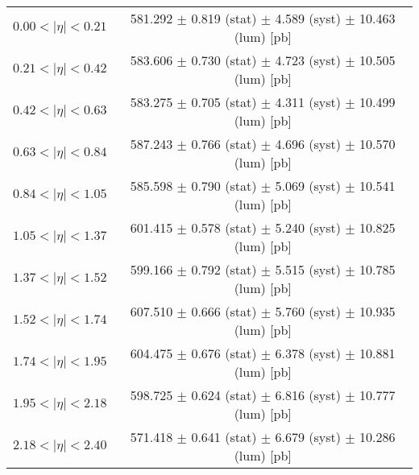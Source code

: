 \begin{tabular}{lc}
\hline
$0.00 < |\eta| <0.21$          & 581.292 $\pm$ 0.819 (stat) $\pm$ 4.589 (syst) $\pm$ 10.463 (lum) [pb]  \\
$0.21 < |\eta| <0.42$          & 583.606 $\pm$ 0.730 (stat) $\pm$ 4.723 (syst) $\pm$ 10.505 (lum) [pb]  \\
$0.42 < |\eta| <0.63$          & 583.275 $\pm$ 0.705 (stat) $\pm$ 4.311 (syst) $\pm$ 10.499 (lum) [pb]  \\
$0.63 < |\eta| <0.84$          & 587.243 $\pm$ 0.766 (stat) $\pm$ 4.696 (syst) $\pm$ 10.570 (lum) [pb]  \\
$0.84 < |\eta| <1.05$          & 585.598 $\pm$ 0.790 (stat) $\pm$ 5.069 (syst) $\pm$ 10.541 (lum) [pb]  \\
$1.05 < |\eta| <1.37$          & 601.415 $\pm$ 0.578 (stat) $\pm$ 5.240 (syst) $\pm$ 10.825 (lum) [pb]  \\
$1.37 < |\eta| <1.52$          & 599.166 $\pm$ 0.792 (stat) $\pm$ 5.515 (syst) $\pm$ 10.785 (lum) [pb]  \\
$1.52 < |\eta| <1.74$          & 607.510 $\pm$ 0.666 (stat) $\pm$ 5.760 (syst) $\pm$ 10.935 (lum) [pb]  \\
$1.74 < |\eta| <1.95$          & 604.475 $\pm$ 0.676 (stat) $\pm$ 6.378 (syst) $\pm$ 10.881 (lum) [pb]  \\
$1.95 < |\eta| <2.18$          & 598.725 $\pm$ 0.624 (stat) $\pm$ 6.816 (syst) $\pm$ 10.777 (lum) [pb]  \\
$2.18 < |\eta| <2.40$          & 571.418 $\pm$ 0.641 (stat) $\pm$ 6.679 (syst) $\pm$ 10.286 (lum) [pb]  \\
\hline
\end{tabular}
